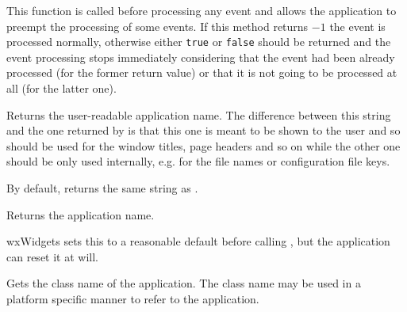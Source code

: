 
This function is called before processing any event and allows the application
to preempt the processing of some events. If this method returns $-1$ the event
is processed normally, otherwise either {\tt true} or {\tt false} should be
returned and the event processing stops immediately considering that the event
had been already processed (for the former return value) or that it is not
going to be processed at all (for the latter one).


\label{wxappgetappdisplayname}


Returns the user-readable application name. The difference between this string
and the one returned by  is that this one
is meant to be shown to the user and so should be used for the window titles,
page headers and so on while the other one should be only used internally, e.g.
for the file names or configuration file keys.

By default, returns the same string as .



\label{wxappgetappname}


Returns the application name.


wxWidgets sets this to a reasonable default before
calling , but the application can reset it at will.




\label{wxappgetclassname}


Gets the class name of the application. The class name may be used in a platform specific
manner to refer to the application.




\label{wxappgetexitonframedelete}

